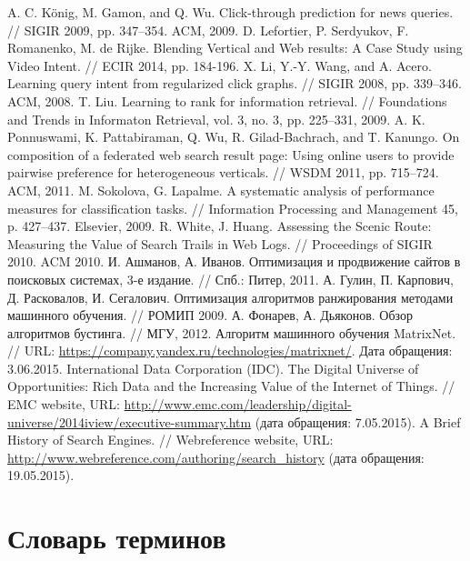 \documentclass[12pt,a4paper]{report}
\begin{document}
\begin{thebibliography}{@}
   A. C. K\"{o}nig, M. Gamon, and Q. Wu. Click-through prediction for news queries. // SIGIR 2009, pp. 347–354. ACM, 2009.
   D. Lefortier, P. Serdyukov, F. Romanenko, M. de Rijke. Blending Vertical and Web results: A Case Study using Video Intent. // ECIR 2014, pp. 184-196.
   X. Li, Y.-Y. Wang, and A. Acero. Learning query intent from regularized click graphs. // SIGIR 2008, pp. 339–346. ACM, 2008.
   T. Liu. Learning to rank for information retrieval. // Foundations and Trends in Informaton Retrieval, vol. 3, no. 3, pp. 225–331, 2009. 
   A. K. Ponnuswami, K. Pattabiraman, Q. Wu,
R. Gilad-Bachrach, and T. Kanungo. On composition of a federated web search result page: Using online users to provide pairwise preference for heterogeneous verticals. //  WSDM 2011, pp. 715–724. ACM, 2011.
   M. Sokolova, G. Lapalme. A systematic analysis of performance measures for classification tasks. // Information Processing and Management 45, p. 427–437. Elsevier, 2009.
   R. White, J. Huang. Assessing the Scenic Route: Measuring the Value of Search Trails in Web Logs. // Proceedings of SIGIR 2010. ACM 2010.    
 И. Ашманов, А. Иванов. Оптимизация и продвижение сайтов в поисковых системах, 3-е издание. // Спб.: Питер, 2011.
   А. Гулин, П. Карпович, Д. Расковалов,
И. Сегалович. Оптимизация алгоритмов ранжирования методами машинного обучения. // РОМИП 2009.
   А. Фонарев, А. Дьяконов. Обзор алгоритмов бустинга. // МГУ, 2012.
   Алгоритм машинного обучения MatrixNet. // URL: \url{https://company.yandex.ru/technologies/matrixnet/}. Дата обращения: 3.06.2015.               
 International Data Corporation (IDC). The Digital Universe of Opportunities: Rich Data and the Increasing Value of the Internet of Things. // EMC website,
  URL: \url{http://www.emc.com/leadership/digital-universe/2014iview/executive-summary.htm} (дата обращения: 7.05.2015).
 A Brief History of Search Engines. // Webreference website, 
  URL: \url{http://www.webreference.com/authoring/search_history} (дата обращения: 19.05.2015).

\end{thebibliography}

\chapter*{Словарь терминов}
\end{document}
